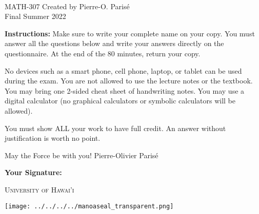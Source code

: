 \documentclass[addpoints, 12pt]{exam}%
\theoremstyle{definition}
\begin{document}
	\noindent \hrulefill \\
	\noindent MATH-307 \hfill Created by Pierre-O. Paris{\'e}\\
	Final \hfill Summer 2022\\\vspace*{-0.7cm}

\noindent\hrulefill
	
\vspace*{1cm}

\noindent{}

\vspace*{1cm}
\begin{center}
\gradetable[h][questions]
\end{center}
\vspace*{1cm}

{\bf Instructions:} Make sure to write your complete name on your copy. You must answer all the questions below and write your answers directly on the questionnaire. At the end of the 80 minutes, return your copy. 

No devices such as a smart phone, cell phone, laptop, or tablet can be used during the exam. You are not allowed to use the lecture notes or the textbook. You may bring one 2-sided cheat sheet of handwriting notes. You may use a digital calculator (no graphical calculators or symbolic calculators will be allowed).

You must show ALL your work to have full credit. An answer without justification is worth no point.

\vspace*{2cm}
\noindent May the Force be with you! \hfill Pierre-Olivier Parisé

\vfill

\noindent\textbf{Your Signature:} \hrulefill

\vspace*{1cm}

\begin{center}
\begin{minipage}{0.29\textwidth}
\begin{Huge}
\textsc{University of Hawai'i}
\end{Huge}
\end{minipage}
\begin{minipage}{0.12\textwidth}
\texttt{[image: ../../../../manoaseal\_transparent.png]}
\end{minipage}
\end{center}
\end{document}
